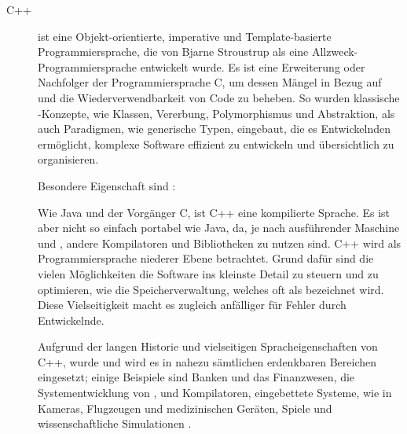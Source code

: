 \begin{description}
    \item[C++] ist eine Objekt-orientierte, imperative und Template-basierte Programmiersprache, die von Bjarne Stroustrup  als eine Allzweck-Programmiersprache entwickelt wurde.
    Es ist eine Erweiterung oder Nachfolger der Programmiersprache C, um dessen Mängel in Bezug auf  und die Wiederverwendbarkeit von Code zu beheben.
    So wurden klassische -Konzepte, wie Klassen, Vererbung, Polymorphismus und Abstraktion, als auch Paradigmen, wie generische Typen, eingebaut, die es Entwickelnden ermöglicht, komplexe Software effizient zu entwickeln und übersichtlich zu organisieren.

    Besondere Eigenschaft sind \uA:

    Wie Java und der Vorgänger C, ist C++ eine kompilierte Sprache.
    Es ist aber nicht so einfach portabel wie Java, da, je nach ausführender Maschine und , andere Kompilatoren und Bibliotheken zu nutzen sind.
    C++ wird als Programmiersprache niederer Ebene betrachtet.
    Grund dafür sind die vielen Möglichkeiten die Software ins kleinste Detail zu steuern und zu optimieren, wie \zB die Speicherverwaltung, welches oft als  bezeichnet wird.
    Diese Vielseitigkeit macht es zugleich anfälliger für Fehler durch Entwickelnde.

    Aufgrund der langen Historie und vielseitigen Spracheigenschaften von C++, wurde und wird es in nahezu sämtlichen erdenkbaren Bereichen eingesetzt;
    einige Beispiele sind Banken und das Finanzwesen, die Systementwicklung von ,  und Kompilatoren, eingebettete Systeme, wie in Kameras, Flugzeugen und medizinischen Geräten, Spiele und wissenschaftliche Simulationen .


\end{description}
